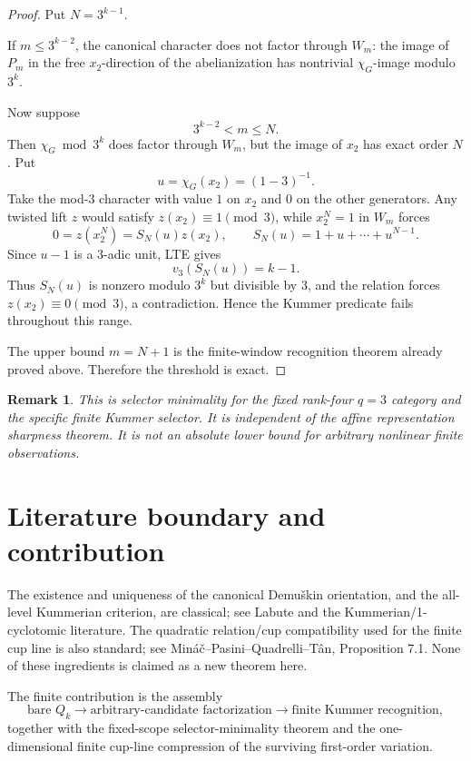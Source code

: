 \documentclass[11pt]{article}
\newtheorem{remark}[theorem]{Remark}
\begin{document}
\begin{proof}
Put $N=3^{k-1}$.

If $m\le3^{k-2}$, the canonical character does not factor through $W_m$:
the image of $P_m$ in the free $x_2$-direction of the abelianization has
nontrivial $\chi_G$-image modulo $3^k$.

Now suppose
\[
3^{k-2}<m\le N.
\]
Then $\chi_G\bmod3^k$ does factor through $W_m$, but the image of $x_2$
has exact order $N$. Put
\[
u=\chi_G(x_2)=(1-3)^{-1}.
\]
Take the mod-$3$ character with value $1$ on $x_2$ and $0$ on the other
generators. Any twisted lift $z$ would satisfy
$z(x_2)\equiv1\pmod3$, while $x_2^N=1$ in $W_m$ forces
\[
0=z(x_2^N)=S_N(u)z(x_2),
\qquad
S_N(u)=1+u+\cdots+u^{N-1}.
\]
Since $u-1$ is a $3$-adic unit, LTE gives
\[
v_3(S_N(u))=k-1.
\]
Thus $S_N(u)$ is nonzero modulo $3^k$ but divisible by $3$, and the
relation forces $z(x_2)\equiv0\pmod3$, a contradiction. Hence the
Kummer predicate fails throughout this range.

The upper bound $m=N+1$ is the finite-window recognition theorem already
proved above. Therefore the threshold is exact.
\end{proof}

\begin{remark}
This is selector minimality for the fixed rank-four $q=3$ category and the
specific finite Kummer selector. It is independent of the affine
representation sharpness theorem. It is not an absolute lower bound for
arbitrary nonlinear finite observations.
\end{remark}

\section{Literature boundary and contribution}

The existence and uniqueness of the canonical Demu\v{s}kin orientation,
and the all-level Kummerian criterion, are classical; see Labute and the
Kummerian/1-cyclotomic literature. The quadratic relation/cup compatibility
used for the finite cup line is also standard; see
Miná\v{c}--Pasini--Quadrelli--T\^an, Proposition 7.1. None of these
ingredients is claimed as a new theorem here.

The finite contribution is the assembly
\[
\text{bare }Q_k
\longrightarrow
\text{arbitrary-candidate factorization}
\longrightarrow
\text{finite Kummer recognition},
\]
together with the fixed-scope selector-minimality theorem and the
one-dimensional finite cup-line compression of the surviving
first-order variation.
\end{document}
